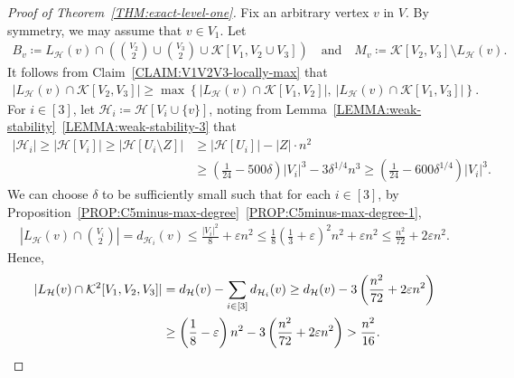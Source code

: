 \documentclass[11pt,a4paper]{article}
\theoremstyle{remark}
\newcommand{\C}[1]{\mathcal{#1}}
\begin{document}
\begin{proof}[Proof of Theorem~\ref{THM:exact-level-one}]
    Fix an arbitrary vertex $v$ in  $V$. 
    By symmetry, we may assume that $v \in V_1$. 
    Let 
    \begin{align*}
        B_{v}
        \coloneqq L_{\mathcal{H}}(v) \cap \left( \binom{V_2}{2} \cup \binom{V_3}{2} \cup \mathcal{K}[V_1, V_2\cup V_3]\right)
        \quad\text{and}\quad 
        M_{v}
        \coloneqq \mathcal{K}[V_2, V_3] \setminus L_{\mathcal{H}}(v). 
    \end{align*}
    It follows from Claim~\ref{CLAIM:V1V2V3-locally-max} that 
    \begin{align}\label{equ:vtx-stab-d}
        |L_{\mathcal{H}}(v) \cap \mathcal{K}[V_2, V_3]| \ge \max\left\{|L_{\mathcal{H}}(v) \cap \mathcal{K}[V_1, V_2]|,~|L_{\mathcal{H}}(v) \cap \mathcal{K}[V_1, V_3]|\right\}.
    \end{align}
    For $i \in [3]$, let $\mathcal{H}_i \coloneqq \mathcal{H}[V_i \cup \{v\}]$, noting from  Lemma~\ref{LEMMA:weak-stability}~\ref{LEMMA:weak-stability-3} that 
    \begin{align*}
        |\mathcal{H}_i|
        \ge |\mathcal{H}[V_i]|
        \ge |\mathcal{H}[U_i \setminus Z]|
        & \ge |\mathcal{H}[U_i]| - |Z| \cdot n^2 \\
        & \ge \left(\frac{1}{24} - 500 \delta\right)|V_i|^3 - 3\delta^{1/4}n^3
        \ge \left(\frac{1}{24} - 600 \delta^{1/4}\right)|V_i|^3. 
    \end{align*}
    We can choose $\delta$ to be sufficiently small such that for each $i \in [3]$, by Proposition~\ref{PROP:C5minus-max-degree}~\ref{PROP:C5minus-max-degree-1}, 
    \begin{align*}
        \left|L_{\mathcal{H}}(v) \cap \binom{V_i}{2}\right|
        = d_{\mathcal{H}_i}(v)
        \le \frac{|V_i|^2}{8} + \varepsilon n^2 
        \le \frac{1}{8}\left(\frac{1}{3}+ \varepsilon\right)^2 n^2 + \varepsilon n^2 
        \le \frac{n^2}{72} + 2\varepsilon n^2. 
    \end{align*}
    Hence,  
    \begin{align}\label{equ:vtx-stab-e}
        |L_{\mathcal{H}}(v) \cap \mathcal{K}^2[V_1, V_2, V_3]|
        & = d_{\mathcal{H}}(v) - \sum_{i\in [3]}d_{\mathcal{H}_i}(v)
         \ge d_{\mathcal{H}}(v) - 3\left(\frac{n^2}{72} + 2\varepsilon n^2\right) \notag \\
        & \ge \left(\frac{1}{8} - \varepsilon\right)n^2 - 3\left(\frac{n^2}{72} + 2\varepsilon n^2\right)
        > \frac{n^2}{16}. 
    \end{align}

\end{proof}
\end{document}
